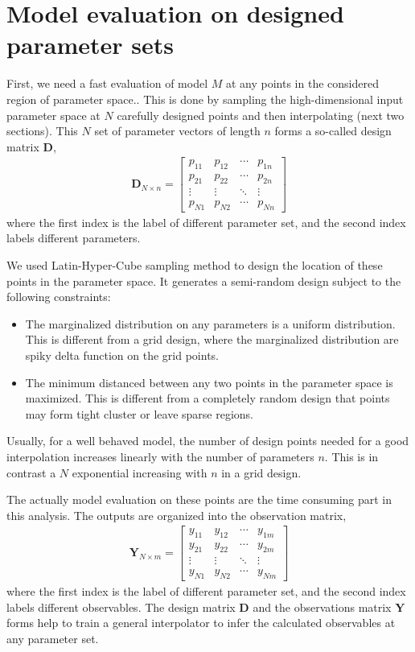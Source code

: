 \section{Model evaluation on designed parameter sets}
First, we need a fast evaluation of model $M$ at any points in the considered region of parameter space..
This is done by sampling the high-dimensional input parameter space at $N$ carefully designed points and then interpolating (next two sections).
This $N$ set of parameter vectors of length $n$ forms a so-called design matrix $\mathbf{D}$,
\begin{eqnarray}
\mathbf{D}_{N\times n} = 
\begin{bmatrix}
p_{11} & p_{12} & \cdots & p_{1n}\\
p_{21} & p_{22} & \cdots & p_{2n}\\
\vdots & \vdots & \ddots & \vdots \\
p_{N1} & p_{N2} & \cdots & p_{Nn}
\end{bmatrix}
\end{eqnarray}
where the first index is the label of different parameter set, and the second index labels different parameters.

We used Latin-Hyper-Cube sampling method to design the location of these points in the parameter space. 
It generates a semi-random design subject to the following constraints:
\begin{itemize}
\item The marginalized distribution on any parameters is a uniform distribution.
This is different from a grid design, where the marginalized distribution are spiky delta function on the grid points.
\item The minimum distanced between any two points in the parameter space is maximized.
This is different from a completely random design that points may form tight cluster or leave sparse regions.
\end{itemize}
Usually, for a well behaved model, the number of design points needed for a good interpolation increases linearly with the number of parameters $n$. 
This is in contrast a $N$ exponential increasing with $n$ in a grid design.

The actually model evaluation on these points are the time consuming part in this analysis.
The outputs are organized into the observation matrix,
\begin{eqnarray}
\mathbf{Y}_{N\times m} = 
\begin{bmatrix}
y_{11} & y_{12} & \cdots & y_{1m}\\
y_{21} & y_{22} & \cdots & y_{2m}\\
\vdots & \vdots & \ddots & \vdots \\
y_{N1} & y_{N2} & \cdots & y_{Nm}
\end{bmatrix}
\end{eqnarray}
where the first index is the label of different parameter set, and the second index labels different observables.
The design matrix $\mathbf{D}$ and the observations matrix $\mathbf{Y}$ forms help to train a general interpolator to infer the calculated observables at any parameter set.

